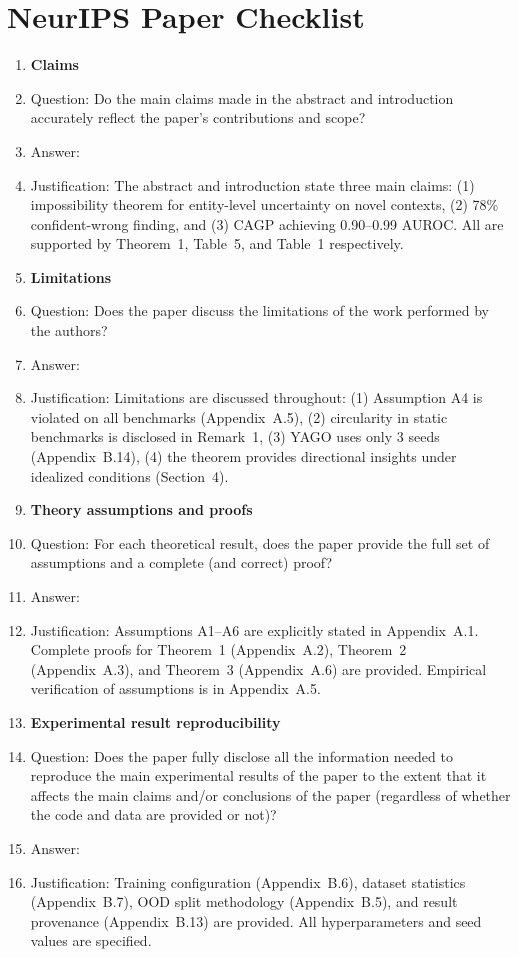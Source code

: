 \section*{NeurIPS Paper Checklist}

\begin{enumerate}

\item {\bf Claims}
    \item[] Question: Do the main claims made in the abstract and introduction accurately reflect the paper's contributions and scope?
    \item[] Answer: \answerYes{}
    \item[] Justification: The abstract and introduction state three main claims: (1) impossibility theorem for entity-level uncertainty on novel contexts, (2) 78\% confident-wrong finding, and (3) CAGP achieving 0.90--0.99 AUROC. All are supported by Theorem~1, Table~5, and Table~1 respectively.

\item {\bf Limitations}
    \item[] Question: Does the paper discuss the limitations of the work performed by the authors?
    \item[] Answer: \answerYes{}
    \item[] Justification: Limitations are discussed throughout: (1) Assumption A4 is violated on all benchmarks (Appendix~A.5), (2) circularity in static benchmarks is disclosed in Remark~1, (3) YAGO uses only 3 seeds (Appendix~B.14), (4) the theorem provides directional insights under idealized conditions (Section~4).

\item {\bf Theory assumptions and proofs}
    \item[] Question: For each theoretical result, does the paper provide the full set of assumptions and a complete (and correct) proof?
    \item[] Answer: \answerYes{}
    \item[] Justification: Assumptions A1--A6 are explicitly stated in Appendix~A.1. Complete proofs for Theorem~1 (Appendix~A.2), Theorem~2 (Appendix~A.3), and Theorem~3 (Appendix~A.6) are provided. Empirical verification of assumptions is in Appendix~A.5.

    \item {\bf Experimental result reproducibility}
    \item[] Question: Does the paper fully disclose all the information needed to reproduce the main experimental results of the paper to the extent that it affects the main claims and/or conclusions of the paper (regardless of whether the code and data are provided or not)?
    \item[] Answer: \answerYes{}
    \item[] Justification: Training configuration (Appendix~B.6), dataset statistics (Appendix~B.7), OOD split methodology (Appendix~B.5), and result provenance (Appendix~B.13) are provided. All hyperparameters and seed values are specified.



\end{enumerate}
